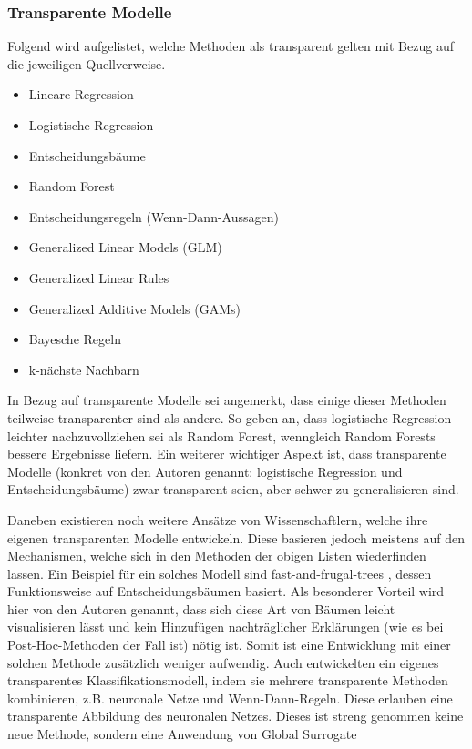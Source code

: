 \subsubsection{Transparente Modelle}
\label{subsubsec_transparenteModelle}
Folgend wird aufgelistet, welche Methoden als transparent gelten mit Bezug auf die jeweiligen Quellverweise.
\begin{itemize}
    \item Lineare Regression \cite{hanif2021survey, chen2021novel, palaniyappan2022aqx, ribeiro2016should}
    \item Logistische Regression \cite{hanif2021survey, schoeffer2022human, krause2017workflow, palaniyappan2022aqx, hill2018balancing}
    \item Entscheidungsbäume \cite{hanif2021survey, chen2021novel, krause2017workflow, de2018algorithmic, palaniyappan2022aqx}
    \item Random Forest \cite{chen2021novel, ribeiro2016should}
    \item Entscheidungsregeln (Wenn-Dann-Aussagen) \cite{hanif2021survey, chen2021novel}
    \item Generalized Linear Models (GLM) \cite{hanif2021survey}
    \item Generalized Linear Rules \cite{hanif2021survey}
    \item Generalized Additive Models (GAMs) \cite{hanif2021survey}
    \item Bayesche Regeln \cite{de2018algorithmic}
    \item k-nächste Nachbarn \cite{palaniyappan2022aqx}
\end{itemize}

In Bezug auf transparente Modelle sei angemerkt, dass einige dieser Methoden teilweise transparenter sind als andere. So geben \cite{hill2018balancing} an, dass logistische Regression leichter nachzuvollziehen sei als Random Forest, wenngleich Random Forests bessere Ergebnisse liefern. Ein weiterer wichtiger Aspekt ist, dass transparente Modelle (konkret von den Autoren genannt: logistische Regression und Entscheidungsbäume) zwar transparent seien, aber schwer zu generalisieren sind.

Daneben existieren noch weitere Ansätze von Wissenschaftlern, welche ihre eigenen transparenten Modelle entwickeln. Diese basieren jedoch meistens auf den Mechanismen, welche sich in den Methoden der obigen Listen wiederfinden lassen. 
Ein Beispiel für ein solches Modell sind fast-and-frugal-trees \cite{keller2020augmenting}, dessen Funktionsweise auf Entscheidungsbäumen basiert. Als besonderer Vorteil wird hier von den Autoren genannt, dass sich diese Art von Bäumen leicht visualisieren lässt und kein Hinzufügen nachträglicher Erklärungen (wie es bei Post-Hoc-Methoden der Fall ist) nötig ist. Somit ist eine Entwicklung mit einer solchen Methode zusätzlich weniger aufwendig.
Auch \cite{ainon2009transparent} entwickelten ein eigenes transparentes Klassifikationsmodell, indem sie mehrere transparente Methoden kombinieren, z.B. neuronale Netze und Wenn-Dann-Regeln. Diese erlauben eine transparente Abbildung des neuronalen Netzes. Dieses ist streng genommen keine neue Methode, sondern eine Anwendung von Global Surrogate 

